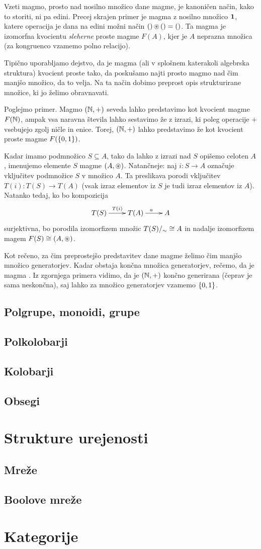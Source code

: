 Vzeti magmo, prosto nad nosilno množico dane magme, je kanoničen način, kako to storiti, ni pa edini. Precej skrajen primer je magma z nosilno množico $\mathtt{\mathbf{1}}$, katere operacija je dana na edini možni način $\mathord{()} \mathop{\circledast}\nolimits \mathord{()} = \mathord{()}$. Ta magma je izomorfna kvocientu \emph{sleherne} proste magme $F(A)$, kjer je $A$ neprazna množica (za kongruenco vzamemo polno relacijo).

Tipično uporabljamo dejstvo, da je magma (ali v splošnem katerakoli algebrska struktura) kvocient proste tako, da poskušamo najti prosto magmo nad čim manjšo množico, da to velja. Na ta način dobimo preprost opis strukturirane množice, ki jo želimo obravnavati.

Poglejmo primer. Magmo $(\mathbb{N}, +)$ seveda lahko predstavimo kot kvocient magme $F(\mathbb{N})$, ampak vsa naravna števila lahko sestavimo že z izrazi, ki poleg operacije $+$ vsebujejo zgolj ničle in enice. Torej, $(\mathbb{N}, +)$ lahko predstavimo že kot kvocient proste magme $F(\set{0, 1})$. 

Kadar imamo podmnožico $S \subseteq A$, tako da lahko z izrazi nad $S$ opišemo celoten $A$, imenujemo elemente $S$  magme $(A, \mathop{\circledast}\nolimits)$. Natančneje: naj $i\colon S \to A$ označuje vključitev podmnožice $S$ v množico $A$. Ta preslikava porodi vključitev $T(i)\colon T(S) \to T(A)$ (vsak izraz elementov iz $S$ je tudi izraz elementov iz $A$). Natanko tedaj, ko bo kompozicija
\[\xymatrix{
T(S) \ar[r]^{T(i)} & T(A) \ar[r]^a & A
}\]
surjektivna, bo porodila izomorfizem množic $T(S)/_\sim \cong A$ in nadalje izomorfizem magem $F(S) \cong (A, \mathop{\circledast}\nolimits)$.

Kot rečeno, za čim preprostejšo predstavitev dane magme želimo čim manjšo množico generatorjev. Kadar obstaja končna množica generatorjev, rečemo, da je magma . Iz zgornjega primera vidimo, da je $(\mathbb{N}, +)$ končno generirana (čeprav je sama neskončna), saj lahko za množico generatorjev vzamemo $\set{0, 1}$.

\subsection{Polgrupe, monoidi, grupe}

\subsection{Polkolobarji}
\subsection{Kolobarji}
\subsection{Obsegi}
\section{Strukture urejenosti}
\subsection{Mreže}
\subsection{Boolove mreže}
\section{Kategorije}


